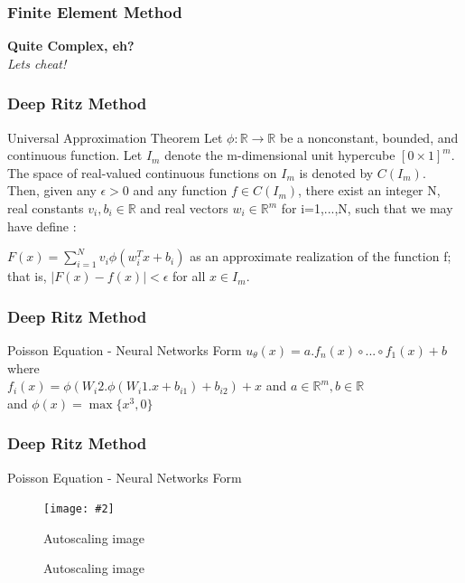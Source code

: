 \documentclass{beamer}
\makeatletter
\newcommand{\R}{\mathbb{R}}
\newcommand{\fitimage}[2][\@nil]{
	\begin{figure}
		\begin{adjustbox}{width=0.9\textwidth, totalheight=\textheight-2\baselineskip-2\baselineskip,keepaspectratio}
			\texttt{[image: \#2]}
		\end{adjustbox}
		\def\tmp{#1}%
		\ifx\tmp\@nnil
		\else
		\caption{#1}
		\fi
	\end{figure}
}
\makeatother
\begin{document}
\begin{frame}
	\frametitle{Finite Element Method}
	
	\textbf{Quite Complex, eh?}\centering\\
	\textit{Lets cheat!}\centering\\
	
\end{frame}


\begin{frame}
	\frametitle{Deep Ritz Method}
	
	\begin{block}{Universal Approximation Theorem}
		Let $\phi:\R \to \R$ be a nonconstant, bounded, and continuous function. Let $I_m$ denote the m-dimensional unit hypercube $[0 \times 1]^m$. The space of real-valued continuous functions on $I_m$ is denoted by $C(I_m)$. Then, given any $\epsilon >0$ and any function $f \in C(I_m)$, there exist an integer N, real constants $v_i, b_i \in \R$ and real vectors $w_i \in \R^m$ for i=1,...,N, such that we may have define :
		
		$F(x) = \sum_{i=1}^{N} v_i \phi(w_{i}^{T}x + b_i)$
		as an approximate realization of the function f; that is,
		$|F(x)-f(x)| < \epsilon$
		for all $x\in I_m$. 
		
	\end{block}	
\end{frame}



\begin{frame}
	\frametitle{Deep Ritz Method}
	
	\begin{block}{Poisson Equation - Neural Networks Form}
	$u_{\theta}(x) = a . f_{n}(x) \circ ... \circ f_{1}(x) +b$ \\
	where \\
	$f_{i}(x) = \phi(W_i2 . \phi(W_i1 . x + b_{i1}) + b_{i2}) + x $ and $a \in \R^m, b\in\R $ \\
	and $\phi(x) = \max\{x^3,0\}$
	\end{block}	
\end{frame}

\begin{frame}
	\frametitle{Deep Ritz Method}
	
	\begin{block}{Poisson Equation - Neural Networks Form}
		\fitimage[Autoscaling image]{DRM.png}
	\end{block}	
	
\end{frame}
\end{document}
